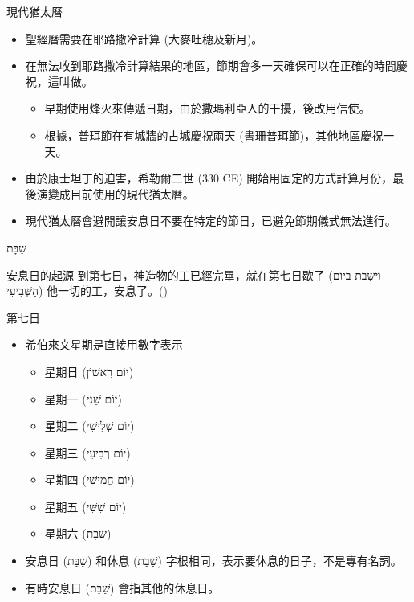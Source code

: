 \documentclass{beamer}
\newcommand{\topic}[1]{
  \begin{frame}
    \centering
    \vspace*{1cm}
    {\fontsize{40}{48}\selectfont #1\par}
    \vfill
  \end{frame}
}
\newcommand{\parvspace}{\par\vspace{0.5em}}
\begin{document}
\begin{frame}{現代猶太曆}
  \begin{itemize}
    \item 聖經曆需要在耶路撒冷計算 (大麥吐穗及新月)。
    \item 在無法收到耶路撒冷計算結果的地區，節期會多一天確保可以在正確的時間慶祝，這叫做\textcite{YomTovSheni}。
      \begin{itemize}
        \item 早期使用烽火來傳遞日期，由於撒瑪利亞人的干擾，後改用信使。
        \item 根據，普珥節在有城牆的古城慶祝兩天 (書珊普珥節)，其他地區慶祝一天。
      \end{itemize}
    \item 由於康士坦丁的迫害，希勒爾二世 (330 CE) 開始用固定的方式計算月份，最後演變成目前使用的現代猶太曆。
    \item 現代猶太曆會避開讓安息日不要在特定的節日，已避免節期儀式無法進行。\parencite{HistoryOfCalendar}
  \end{itemize}
\end{frame}

\topic{\texthebrew{שַׁבָּת}}

\begin{frame}{安息日的起源}
  到第七日，神造物的工已經完畢，就在\alert{第七日歇了 (\texthebrew{וַיִּשְׁבֹּת בַּיּוֹם
  הַשְּׁבִיעִי})} 他一切的工，安息了。()\parvspace
\end{frame}

\begin{frame}{第七日}
  \begin{itemize}
    \item 希伯來文星期是直接用數字表示
      \begin{itemize}
        \item 星期日 (\texthebrew{יוֹם רִאשׁוֹן})
        \item 星期一 (\texthebrew{יוֹם שֵׁנִי})
        \item 星期二 (\texthebrew{יוֹם שְׁלִישִׁי})
        \item 星期三 (\texthebrew{יוֹם רְבִיעִי})
        \item 星期四 (\texthebrew{יוֹם חֲמִישִׁי})
        \item 星期五 (\texthebrew{יוֹם שִׁשִּׁי})
        \item 星期六 (\texthebrew{שַׁבָּת})
      \end{itemize}
    \item 安息日 (\texthebrew{שַׁבָּת}) 和休息 (\texthebrew{שָׁבַת})
      字根相同，表示要休息的日子，不是專有名詞。
    \item 有時安息日 (\texthebrew{שַׁבָּת}) 會指其他的休息日。
  \end{itemize}
\end{frame}
\end{document}
